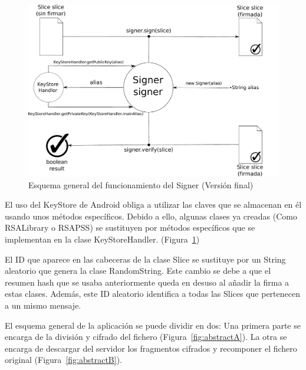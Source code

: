 \begin{figure}[ht]
  \centering
  \includegraphics[scale=0.5]{Figures/Signer_2}
  \decoRule
  \caption[Signer (Versión final)]{Esquema general del funcionamiento del Signer (Versión final)}
  \label{fig:Signer_2}
\end{figure}

El uso del KeyStore de Android obliga a utilizar las claves que se almacenan en
él usando unos métodos específicos. Debido a ello, algunas clases ya creadas
(Como RSALibrary o RSAPSS) se sustituyen por métodos específicos que se
implementan en la clase KeyStoreHandler. (Figura~\ref{fig:Signer_2})


El ID que aparece en las cabeceras de la clase Slice se sustituye por un String
aleatorio que genera la clase RandomString. Este cambio se debe a que el resumen
hash que se usaba anteriormente queda en desuso al añadir la firma a estas
clases. Además, este ID aleatorio identifica a todas las Slices que pertenecen
a un mismo mensaje.

El esquema general de la aplicación se puede dividir en dos: Una primera parte
se encarga de la división y cifrado del fichero (Figura~\ref{fig:abstractA}). La
otra se encarga de descargar del servidor los fragmentos cifrados y recomponer
el fichero original (Figura~\ref{fig:abstractB}).

